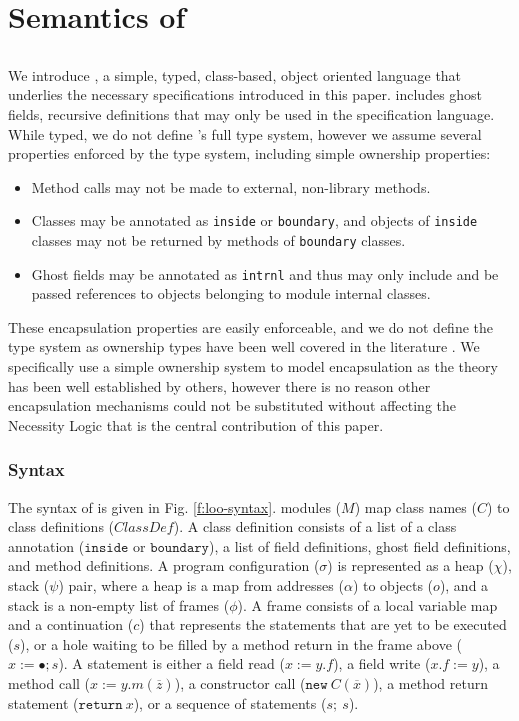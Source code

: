 \section{Semantics of \Chainmail}
\label{s:semantics}

\subsection{\Loo}

We introduce \Loo, a simple, typed, class-based, object oriented language that underlies the necessary specifications
introduced in this paper. \Loo includes ghost fields, recursive definitions that may only be
used in the specification language.
While typed, we do not define \Loo's
full type system, however we assume several properties enforced by the type system, including 
simple ownership properties:
\begin{itemize}
\item
Method calls may not be made to external, non-library methods.
\item
Classes may be annotated as \texttt{inside} or \texttt{boundary}, and objects of \texttt{inside} classes may not be returned by methods of \texttt{boundary} classes.
\item
Ghost fields may be annotated as \texttt{intrnl} and thus may only include and be passed references to objects belonging to module internal classes.
\end{itemize}
These encapsulation properties are easily enforceable, and we
do not define the type system as ownership types have been 
well covered in the literature \cite{ownership stuff}. 
We specifically use a simple ownership system to model 
encapsulation as the theory has been well established by others, 
however there is no reason other encapsulation mechanisms could 
not be substituted without affecting the Necessity Logic that 
is the central contribution of this paper.

\subsubsection{\Loo Syntax}
The syntax of \Loo is given in Fig. \ref{f:loo-syntax}.
\Loo modules ($M$) map class names ($C$) to class definitions ($\textit{ClassDef}$).
A class definition consists of a list of a class annotation ($\texttt{inside}$ or $\texttt{boundary}$),
a list of field definitions, ghost field definitions, and method definitions.
A program configuration ($\sigma$) is represented as a heap ($\chi$), stack ($\psi$) pair, 
where a heap is a map from addresses ($\alpha$) to objects ($o$), and a stack is a non-empty list of frames ($\phi$). A frame consists of a local variable
map and a continuation ($c$) that represents the statements that are yet to be executed ($s$),
or a hole waiting to be filled by a method return in the frame above ($x := \bullet; s$).
A statement is either a field read ($x := y.f$), a field write ($x.f := y$), a method call
($x := y.m(\overline{z})$), a constructor call ($\texttt{new}\ C(\overline{x})$), a method return statement
($\texttt{return}\ x$), or a sequence of statements ($s;\ s$).


